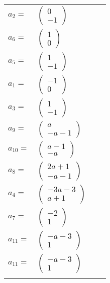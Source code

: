 \documentclass[1p]{elsarticle_modified}
\theoremstyle{definition}
\begin{document}
\begin{tabular}{m{7pt} m{180pt} m{7pt} m{180pt} }
\flushright $a_{2}=$&$\begin{pmatrix}0\\-1\end{pmatrix}$ \\
\flushright $a_{6}=$&$\begin{pmatrix}1\\0\end{pmatrix}$ \\
\flushright $a_{5}=$&$\begin{pmatrix}1\\-1\end{pmatrix}$ \\
\flushright $a_{1}=$&$\begin{pmatrix}-1\\0\end{pmatrix}$ \\
\flushright $a_{3}=$&$\begin{pmatrix}1\\-1\end{pmatrix}$ \\
\flushright $a_{9}=$&$\begin{pmatrix}a\\- a-1\end{pmatrix}$ \\
\flushright $a_{10}=$&$\begin{pmatrix}a-1\\- a\end{pmatrix}$ \\
\flushright $a_{8}=$&$\begin{pmatrix}2 a+1\\- a-1\end{pmatrix}$ \\
\flushright $a_{4}=$&$\begin{pmatrix}-3 a-3\\a+1\end{pmatrix}$ \\
\flushright $a_{7}=$&$\begin{pmatrix}-2\\1\end{pmatrix}$ \\
\flushright $a_{11}=$&$\begin{pmatrix}- a-3\\1\end{pmatrix}$\\ \flushright $a_{11}=$&$\begin{pmatrix}- a-3\\1\end{pmatrix}$\\&\end{tabular}
\end{document}
